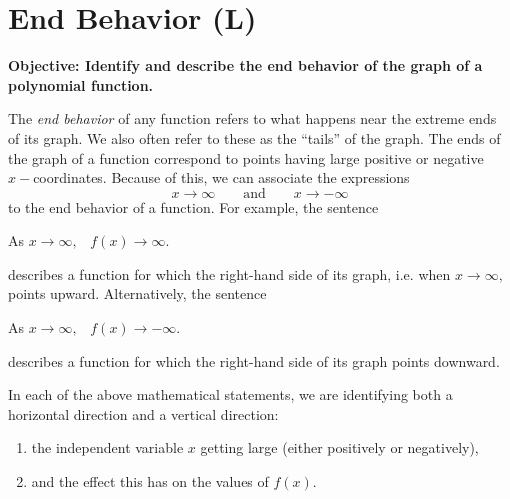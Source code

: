 \documentclass[12pt]{book}
\theoremstyle{definition}
\begin{document}
\section{End Behavior (L)}
{\bf Objective: Identify and describe the end behavior of the graph of a polynomial function.}\par
The {\it end behavior} of any function refers to what happens near the extreme ends of its graph.  We also often refer to these as the ``tails'' of the graph.  The ends of the graph of a function correspond to points having large positive or negative $x-$coordinates.  Because of this, we can associate the expressions
$$x\rightarrow\infty\qquad\text{and}\qquad x\rightarrow -\infty$$
to the end behavior of a function.  For example, the sentence
\begin{center}
As $x\rightarrow\infty,$ \ $f(x)\rightarrow\infty$.
\end{center}
describes a function for which the right-hand side of its graph, i.e. when $x\rightarrow\infty,$ points upward.  Alternatively, the sentence  
\begin{center}
As $x\rightarrow\infty,$ \ $f(x)\rightarrow -\infty$.
\end{center}
describes a function for which the right-hand side of its graph points downward.
\par
In each of the above mathematical statements, we are identifying both a horizontal direction and a vertical direction:
\begin{enumerate}
	\item  the independent variable $x$ getting large (either positively or negatively),
	\item and the effect this has on the values of $f(x)$.
\end{enumerate}
\end{document}
